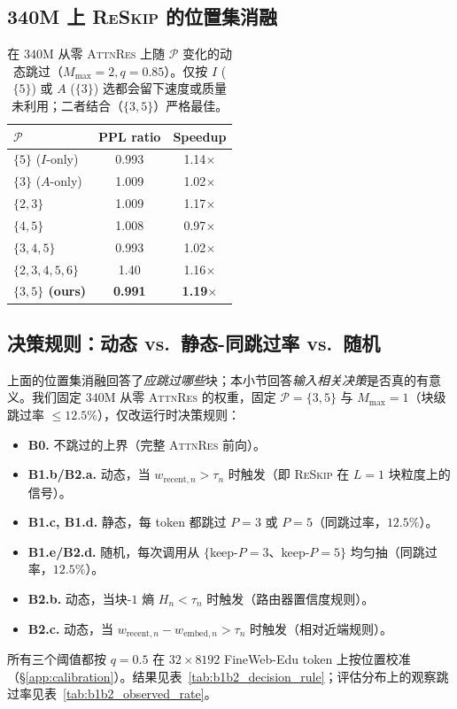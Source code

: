 \documentclass{article}
\newcommand{\attnres}{\textsc{AttnRes}}
\newcommand{\reskip}{\textsc{ReSkip}}
\begin{document}
\subsection{340M 上 \reskip{} 的位置集消融}
\label{app:reskip_position_ablation}
\begin{table}[h]
\caption{在 $340$M 从零 \attnres{} 上随 $\mathcal{P}$ 变化的动态跳过（$M_{\max}{=}2, q{=}0.85$）。仅按 $I$ ($\{5\}$) 或 $A$ ($\{3\}$) 选都会留下速度或质量未利用；二者结合（$\{3,5\}$）严格最佳。}
\label{tab:reskip_position_ablation}
\centering\small
\begin{tabular}{lcc}
\toprule
$\mathcal{P}$ & PPL ratio & Speedup \\
\midrule
$\{5\}$ ($I$-only) & 0.993 & 1.14$\times$ \\
$\{3\}$ ($A$-only) & 1.009 & 1.02$\times$ \\
$\{2,3\}$ & 1.009 & 1.17$\times$ \\
$\{4,5\}$ & 1.008 & 0.97$\times$ \\
$\{3,4,5\}$ & 0.993 & 1.02$\times$ \\
$\{2,3,4,5,6\}$ & 1.40 & 1.16$\times$ \\
\midrule
\textbf{$\{3,5\}$ (ours)} & \textbf{0.991} & \textbf{1.19$\times$} \\
\bottomrule
\end{tabular}
\end{table}

\subsection{决策规则：动态 vs.\ 静态-同跳过率 vs.\ 随机}
\label{app:b1b2_decision_rule}
上面的位置集消融回答了\emph{应跳过哪些}块；本小节回答\emph{输入相关决策}是否真的有意义。我们固定 $340$M 从零 \attnres{} 的权重，固定 $\mathcal{P}{=}\{3,5\}$ 与 $M_{\max}{=}1$（块级跳过率 $\le 12.5\%$），仅改运行时决策规则：
\begin{itemize}\setlength{\itemsep}{0pt}
  \item \textbf{B0.} 不跳过的上界（完整 \attnres{} 前向）。
  \item \textbf{B1.b/B2.a.} 动态，当 $w_{\text{recent},n} > \tau_n$ 时触发（即 \reskip{} 在 $L{=}1$ 块粒度上的信号）。
  \item \textbf{B1.c, B1.d.} 静态，每 token 都跳过 $P{=}3$ 或 $P{=}5$（同跳过率，$12.5\%$）。
  \item \textbf{B1.e/B2.d.} 随机，每次调用从 $\{$keep-$P{=}3$、keep-$P{=}5\}$ 均匀抽（同跳过率，$12.5\%$）。
  \item \textbf{B2.b.} 动态，当块-$1$ 熵 $H_n < \tau_n$ 时触发（路由器置信度规则）。
  \item \textbf{B2.c.} 动态，当 $w_{\text{recent},n} - w_{\text{embed},n} > \tau_n$ 时触发（相对近端规则）。
\end{itemize}
所有三个阈值都按 $q{=}0.5$ 在 $32{\times}8192$ FineWeb-Edu token 上按位置校准（\S\ref{app:calibration}）。结果见表~\ref{tab:b1b2_decision_rule}；评估分布上的观察跳过率见表~\ref{tab:b1b2_observed_rate}。
\end{document}
